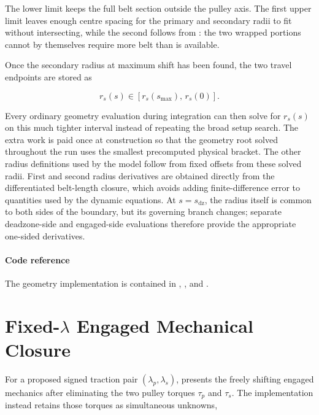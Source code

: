 \documentclass[11pt]{report}
\numberwithin{equation}{section}
\begin{document}
The lower limit keeps the full belt section outside the pulley axis.  The first
upper limit leaves enough centre spacing for the primary and secondary radii to
fit without intersecting, while the second follows from
: the two wrapped portions cannot by
themselves require more belt than is available.

Once the secondary radius at maximum shift has been found, the two travel
endpoints are stored as

\begin{equation}
    r_s(s)\in\left[r_s(s_{\max}),\,r_s(0)\right].
    \label{eq:appendix_secondary_runtime_bracket}
\end{equation}

Every ordinary geometry evaluation during integration can then solve for
$r_s(s)$ on this much tighter interval instead of repeating the broad setup
search.  The extra work is paid once at construction so that the geometry root
solved throughout the run uses the smallest precomputed physical bracket.
The other radius definitions used by the model follow from fixed offsets from
these solved radii.  First and second radius derivatives are obtained directly from the differentiated belt-length closure,
which avoids adding finite-difference error to quantities used by the dynamic
equations.  At $s=s_{\mathrm{dz}}$, the radius itself is common to both sides
of the boundary, but its governing branch changes; separate deadzone-side and
engaged-side evaluations therefore provide the appropriate one-sided
derivatives.

\paragraph{Code reference}
The geometry implementation is contained in
,
, and
.

\section{Fixed-$\lambda$ Engaged Mechanical Closure}
\label{app:num_fixed_lambda}

For a proposed signed traction pair $(\lambda_p,\lambda_s)$,
 presents the freely shifting engaged
mechanics after eliminating the two pulley torques $\tau_p$ and $\tau_s$.  The implementation instead
retains those torques as simultaneous unknowns,
\end{document}
